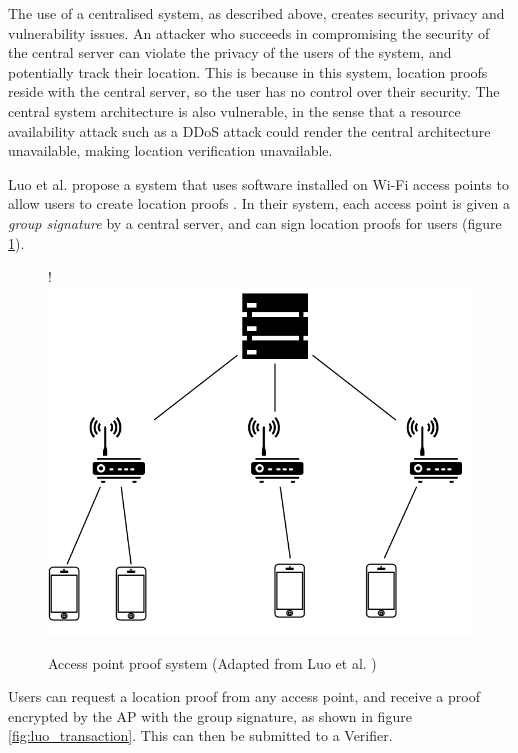 The use of a centralised system, as described above, creates security, privacy and vulnerability issues. An attacker who succeeds in compromising the security of the central server can violate the privacy of the users of the system, and potentially track their location. This is because in this system, location proofs reside with the central server, so the user has no control over their security. The central system architecture is also vulnerable, in the sense that a resource availability attack such as a DDoS attack could render the central architecture unavailable, making location verification unavailable.

Luo et al. propose a system that uses software installed on Wi-Fi access points to allow users to create location proofs \cite{luo}. In their system, each access point is given a \textit{group signature} by a central server, and can sign location proofs for users (figure \ref{fig:luo_diagram}).

\begin{figure}[H]
\begin{center}
 {!} {\includegraphics{diagrams/ap_paper.png}}
\caption{Access point proof system (Adapted from Luo et al. \cite{luo})}
\label{fig:luo_diagram}
\end{center}
\end{figure}

Users can request a location proof from any access point, and receive a proof encrypted by the AP with the group signature, as shown in figure \ref{fig:luo_transaction}. This can then be submitted to a Verifier.

